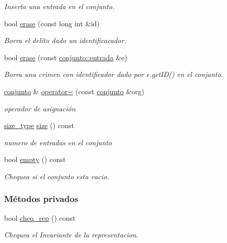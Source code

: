 \begin{DoxyCompactItemize}
\begin{DoxyCompactList}\small\item\em Inserta una entrada en el conjunto. \end{DoxyCompactList}\item 
bool \hyperlink{classconjunto_ad550177fa4454da3a10fa356417e39a7}{erase} (const long int \&id)
\begin{DoxyCompactList}\small\item\em Borra el delito dado un identificacador. \end{DoxyCompactList}\item 
bool \hyperlink{classconjunto_a77a21ed91f1002f4eaed48d86535a874}{erase} (const \hyperlink{classconjunto_a09cad766dd65de73e51eae21f9d22585}{conjunto\+::entrada} \&e)
\begin{DoxyCompactList}\small\item\em Borra una crimen con identificador dado por e.\+get\+I\+D() en el conjunto. \end{DoxyCompactList}\item 
\hyperlink{classconjunto}{conjunto} \& \hyperlink{classconjunto_a2bdce402a4b76117b68fe71c0dffab87}{operator=} (const \hyperlink{classconjunto}{conjunto} \&org)
\begin{DoxyCompactList}\small\item\em operador de asignación \end{DoxyCompactList}\item 
\hyperlink{classconjunto_a855a5893bb0f5a851ab2dbf2b8aa6cc7}{size\+\_\+type} \hyperlink{classconjunto_a863e1e106e35adda47e7c5e2067295b9}{size} () const 
\begin{DoxyCompactList}\small\item\em numero de entradas en el conjunto \end{DoxyCompactList}\item 
bool \hyperlink{classconjunto_afcf4ff3ff3c1f83b63e901efebe93533}{empty} () const 
\begin{DoxyCompactList}\small\item\em Chequea si el conjunto esta vacio. \end{DoxyCompactList}\end{DoxyCompactItemize}
\subsubsection*{Métodos privados}
\begin{DoxyCompactItemize}
\item 
bool \hyperlink{classconjunto_adb0ff15cf65817b0b279bae4bf06decb}{cheq\+\_\+rep} () const 
\begin{DoxyCompactList}\small\item\em Chequea el Invariante de la representacion. \end{DoxyCompactList}\end{DoxyCompactItemize}
